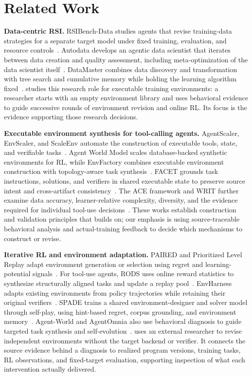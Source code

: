 \section{Related Work}
\label{sec:related}

\textbf{Data-centric RSI.}\quad
RSIBench-Data studies agents that revise training-data strategies for a
separate target model under fixed training, evaluation, and resource
controls~\citep{rsibenchdata}. Autodata develops an agentic data scientist
that iterates between data creation and quality assessment, including
meta-optimization of the data scientist itself~\citep{autodata}. DataMaster
combines data discovery and transformation with tree search and cumulative
memory while holding the learning algorithm fixed~\citep{datamaster}.
\method{} studies this research role for executable training environments:
a researcher starts with an empty environment library and uses
behavioral evidence to guide successive rounds of environment revision and
online RL. Its focus is the evidence supporting those research decisions.

\textbf{Executable environment synthesis for tool-calling agents.}\quad
AgentScaler, EnvScaler, and ScaleEnv automate the construction of executable
tools, state, and verifiable tasks~\citep{agentscaler,envscaler,scaleenv}.
Agent World Model scales database-backed synthetic environments for RL,
while EnvFactory combines executable environment construction with
topology-aware task synthesis~\citep{awm,envfactory}. FACET grounds task
instructions, solutions, and verifiers in shared executable state to preserve
source intent and cross-artifact consistency~\citep{facet}. The ACE framework
and WRIT further examine data accuracy, learner-relative complexity,
diversity, and the evidence required for individual tool-use
decisions~\citep{ace,writ}. These works establish construction and validation
principles that \method{} builds on; our emphasis is using source-traceable
behavioral analysis and actual-training feedback to decide which mechanisms
to construct or revise.

\textbf{Iterative RL and environment adaptation.}\quad
PAIRED and Prioritized Level Replay adapt environment generation or selection
using regret and learning-potential signals~\citep{paired,plr}. For tool-use
agents, RODS uses online reward statistics to synthesize structurally aligned
tasks and update a replay pool~\citep{rods}. EnvHarness adapts existing
environments from policy trajectories while retaining their original
verifiers~\citep{envharness}. SPADE trains a shared environment-designer and
solver model through self-play, using hint-based regret, corpus grounding,
and environment memory~\citep{spade}. Agent-World and AgentOmnia also use
behavioral diagnosis to guide targeted task synthesis and
self-evolution~\citep{agentworld,agentomnia}. \method{} uses an external
researcher to revise independent environments without the target backend or
verifier. It connects the source evidence behind a diagnosis to realized
program versions, training tasks, RL observations, and fixed-target
evaluation, supporting inspection of what each intervention actually delivered.
